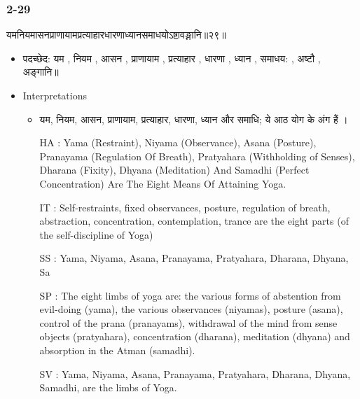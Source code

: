 \begin{frame}[fragile]\frametitle{2-29}
\begin{sanskrit}
यमनियमासनप्राणायामप्रत्याहारधारणाध्यानसमाधयोऽष्टावङ्गानि॥२९॥
\end{sanskrit}

	\begin{itemize}
	\item पदच्छेद: यम , नियम , आसन , प्राणायाम , प्रत्याहार , धारणा , ध्यान , समाधय: , अष्टौ , अङ्गानि॥
	\item Interpretations
		\begin{itemize}
		\item यम, नियम, आसन, प्राणायाम, प्रत्याहार, धारणा, ध्यान और समाधि; ये आठ योग के अंग हैं ।
		\item [HA]: Yama (Restraint), Niyama (Observance), Asana (Posture), Pranayama (Regulation Of Breath), Pratyahara (Withholding of Senses), Dharana (Fixity), Dhyana (Meditation) And Samadhi (Perfect Concentration) Are The Eight Means Of Attaining Yoga.
		\item [IT]: Self-restraints, fixed observances, posture, regulation of breath, abstraction, concentration, contemplation, trance are the eight parts (of the self-discipline of Yoga)
		\item [SS]:  Yama, Niyama, Asana, Pranayama, Pratyahara, Dharana, Dhyana, Sa
		\item [SP]: The eight limbs of yoga are: the various forms of abstention from evil-doing (yama), the various observances (niyamas), posture (asana), control of the prana (pranayams), withdrawal of the mind from sense objects (pratyahara), concentration (dharana), meditation (dhyana) and absorption in the Atman (samadhi).
		\item [SV]: Yama, Niyama, Asana, Pranayama, Pratyahara, Dharana, Dhyana, Samadhi, are the limbs of Yoga. 
		\end{itemize}
	\end{itemize}	
\end{frame}


